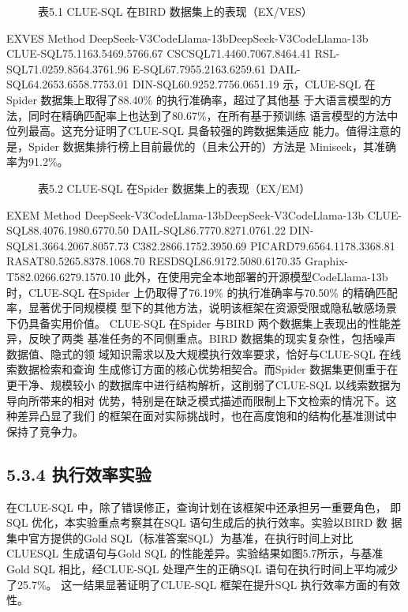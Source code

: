 \documentclass[12pt,a4paper,openright,UTF8]{ctexbook}
\begin{document}
\begin{figure}[htbp]
\centering
{}
\caption{表5.1 CLUE-SQL 在BIRD 数据集上的表现（EX/VES）}
\end{figure}

EXVES Method DeepSeek-V3CodeLlama-13bDeepSeek-V3CodeLlama-13b CLUE-SQL75.1163.5469.5766.67 CSCSQL71.4460.7067.8464.41 RSL-SQL71.0259.8564.3761.96 E-SQL67.7955.2163.6259.61 DAIL-SQL64.2653.6558.7753.01 DIN-SQL60.9252.7756.0651.19 示，CLUE-SQL 在Spider 数据集上取得了88.40\% 的执行准确率，超过了其他基 于大语言模型的方法，同时在精确匹配率上也达到了80.67\%，在所有基于预训练 语言模型的方法中位列最高。这充分证明了CLUE-SQL 具备较强的跨数据集适应 能力。值得注意的是，Spider 数据集排行榜上目前最优的（且未公开的）方法是 Miniseek，其准确率为91.2\%。

\begin{figure}[htbp]
\centering
{}
\caption{表5.2 CLUE-SQL 在Spider 数据集上的表现（EX/EM）}
\end{figure}

EXEM Method DeepSeek-V3CodeLlama-13bDeepSeek-V3CodeLlama-13b CLUE-SQL88.4076.1980.6770.50 DAIL-SQL86.7770.8271.0761.22 DIN-SQL81.3664.2067.8057.73 C382.2866.1752.3950.69 PICARD79.6564.1178.3368.81 RASAT80.5265.8378.1068.70 RESDSQL86.9172.5080.6170.35 Graphix-T582.0266.6279.1570.10 此外，在使用完全本地部署的开源模型CodeLlama-13b 时，CLUE-SQL 在Spider 上仍取得了76.19\% 的执行准确率与70.50\% 的精确匹配率，显著优于同规模模 型下的其他方法，说明该框架在资源受限或隐私敏感场景下仍具备实用价值。 CLUE-SQL 在Spider 与BIRD 两个数据集上表现出的性能差异，反映了两类 基准任务的不同侧重点。BIRD 数据集的现实复杂性，包括噪声数据值、隐式的领 域知识需求以及大规模执行效率要求，恰好与CLUE-SQL 在线索数据检索和查询 生成修订方面的核心优势相契合。而Spider 数据集更侧重于在更干净、规模较小 的数据库中进行结构解析，这削弱了CLUE-SQL 以线索数据为导向所带来的相对 优势，特别是在缺乏模式描述而限制上下文检索的情况下。这种差异凸显了我们 的框架在面对实际挑战时，也在高度饱和的结构化基准测试中保持了竞争力。

\subsection{5.3.4 执行效率实验}

在CLUE-SQL 中，除了错误修正，查询计划在该框架中还承担另一重要角色， 即SQL 优化，本实验重点考察其在SQL 语句生成后的执行效率。实验以BIRD 数 据集中官方提供的Gold SQL（标准答案SQL）为基准，在执行时间上对比CLUESQL 生成语句与Gold SQL 的性能差异。实验结果如图5.7所示，与基准Gold SQL 相比，经CLUE-SQL 处理产生的正确SQL 语句在执行时间上平均减少了25.7\%。 这一结果显著证明了CLUE-SQL 框架在提升SQL 执行效率方面的有效性。
\end{document}

